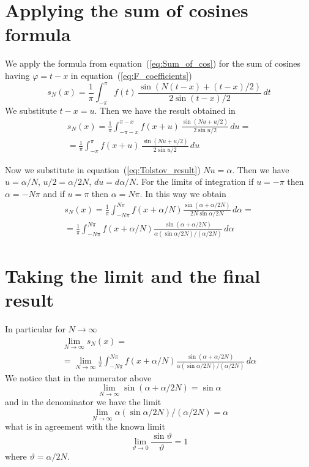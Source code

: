 \documentclass[12pt]{amsart}
\theoremstyle{definition}
\numberwithin{equation}{section}
\begin{document}
\section{Applying the sum of cosines formula}
We apply the formula from equation~(\ref{eq:Sum_of_cos}) for the sum of cosines having $\varphi=t-x$
in equation~(\ref{eq:F_coefficients})
\begin{equation}
s_{N}(x) = \frac{1}{\pi} \int_{-\pi}^{\pi} f(t) \, \frac{\sin(N(t-x)+(t-x)/2)}{2 \sin (t-x)/2} \, dt
\end{equation}
We substitute $t-x = u$\@. Then we have the result obtained in~\cite{kn:Tolstov_Book}
\begin{eqnarray}
\label{eq:Tolstov_result}
s_{N}(x) = \frac{1}{\pi} \int_{-\pi-x}^{\pi-x} f(x+u) \, \frac{\sin(Nu+u/2)}{2 \sin u/2} \, du  =   \\ \nonumber
=
\frac{1}{\pi} \int_{-\pi}^{\pi} f(x+u) \, \frac{\sin(Nu+u/2)}{2 \sin u/2} \, du
\end{eqnarray}

Now we substitute in equation~(\ref{eq:Tolstov_result})
$Nu=\alpha$\@. Then we have $u=\alpha/N$, $u/2=\alpha/2N$, $du=d\alpha/N$\@.
For the limits of integration
if $u=-\pi$ then $\alpha=-N\pi$ and if $u=\pi$ then $\alpha=N\pi$\@.
In this way we obtain
\begin{eqnarray}
s_{N}(x) = \frac{1}{\pi} \int_{-N\pi}^{N\pi} f(x+\alpha/N) \frac{\sin(\alpha+\alpha/2N)}{2N \sin \alpha/2N} \, d\alpha  =    \\ \nonumber
= \frac{1}{\pi} \int_{-N\pi}^{N\pi} f(x+\alpha/N) \frac{\sin(\alpha+\alpha/2N)}{\alpha (\sin \alpha/2N)/(\alpha/2N)} \, d\alpha
\end{eqnarray}




\section{Taking the limit and the final result}
In particular for $N \rightarrow \infty$
\begin{eqnarray}
\lim_{N \rightarrow \infty} s_{N}(x) =         \\ \nonumber
=
\lim_{N \rightarrow \infty} \frac{1}{\pi} \int_{-N\pi}^{N\pi} f(x+\alpha/N) \frac{\sin(\alpha+\alpha/2N)}{\alpha (\sin \alpha/2N)/(\alpha/2N)} \, d\alpha       
\end{eqnarray}
We notice that in the numerator above
\begin{equation}
\lim_{N \rightarrow \infty} \sin(\alpha+\alpha/2N) = \sin \alpha
\end{equation}
and in the denominator we have the limit
\begin{equation}
\lim_{N \rightarrow \infty} \alpha (\sin \alpha/2N)/(\alpha/2N) = \alpha
\end{equation}
what is in agreement with the known limit
\begin{equation}
\lim_{\vartheta \rightarrow 0} \frac{\sin \vartheta}{\vartheta} = 1
\end{equation}
where $\vartheta=\alpha/2N$\@.
\end{document}
